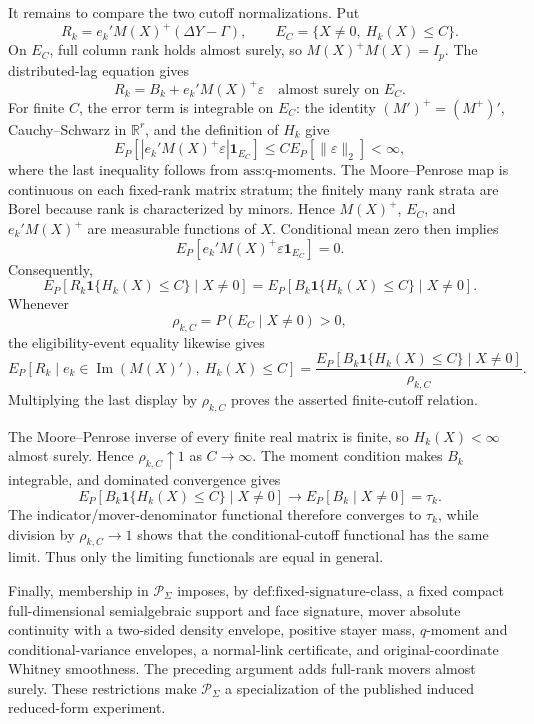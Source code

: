 It remains to compare the two cutoff normalizations. Put
\[
R_k=e_k'M(X)^+(\Delta Y-\Gamma),
\qquad
E_C=\{X\ne0,\ H_k(X)\le C\}.
\]
On \(E_C\), full column rank holds almost surely, so \(M(X)^+M(X)=I_p\). The distributed-lag equation gives
\[
R_k=B_k+e_k'M(X)^+\varepsilon
\quad\text{almost surely on }E_C.
\]
For finite \(C\), the error term is integrable on \(E_C\): the identity \((M')^+=(M^+)'\), Cauchy--Schwarz in \(\mathbb R^r\), and the definition of \(H_k\) give
\[
E_P\!\left[|e_k'M(X)^+\varepsilon|\mathbf 1_{E_C}\right]
\le C E_P[\lVert\varepsilon\rVert_2]<\infty,
\]
where the last inequality follows from \(\text{ass:q-moments}\). The Moore--Penrose map is continuous on each fixed-rank matrix stratum; the finitely many rank strata are Borel because rank is characterized by minors. Hence \(M(X)^+\), \(E_C\), and \(e_k'M(X)^+\) are measurable functions of \(X\). Conditional mean zero then implies
\[
E_P[e_k'M(X)^+\varepsilon\mathbf 1_{E_C}]=0.
\]
Consequently,
\[
E_P[R_k\mathbf 1\{H_k(X)\le C\}\mid X\ne0]
=E_P[B_k\mathbf 1\{H_k(X)\le C\}\mid X\ne0].
\]
Whenever
\[
\rho_{k,C}=P(E_C\mid X\ne0)>0,
\]
the eligibility-event equality likewise gives
\[
E_P[R_k\mid e_k\in\operatorname{Im}(M(X)'),\ H_k(X)\le C]
=\frac{E_P[B_k\mathbf 1\{H_k(X)\le C\}\mid X\ne0]}{\rho_{k,C}}.
\]
Multiplying the last display by \(\rho_{k,C}\) proves the asserted finite-cutoff relation.

The Moore--Penrose inverse of every finite real matrix is finite, so \(H_k(X)<\infty\) almost surely. Hence \(\rho_{k,C}\uparrow1\) as \(C\to\infty\). The moment condition makes \(B_k\) integrable, and dominated convergence gives
\[
E_P[B_k\mathbf 1\{H_k(X)\le C\}\mid X\ne0]
\longrightarrow E_P[B_k\mid X\ne0]=\tau_k.
\]
The indicator/mover-denominator functional therefore converges to \(\tau_k\), while division by \(\rho_{k,C}\to1\) shows that the conditional-cutoff functional has the same limit. Thus only the limiting functionals are equal in general.

Finally, membership in \(\mathcal P_\Sigma\) imposes, by \(\text{def:fixed-signature-class}\), a fixed compact full-dimensional semialgebraic support and face signature, mover absolute continuity with a two-sided density envelope, positive stayer mass, \(q\)-moment and conditional-variance envelopes, a normal-link certificate, and original-coordinate Whitney smoothness. The preceding argument adds full-rank movers almost surely. These restrictions make \(\mathcal P_\Sigma\) a specialization of the published induced reduced-form experiment.


